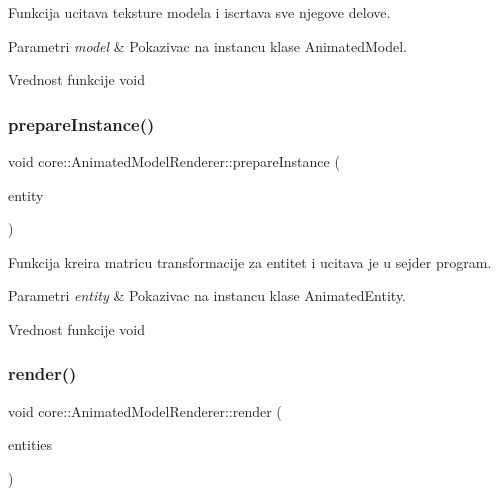 Funkcija ucitava teksture modela i iscrtava sve njegove delove. 


\begin{DoxyParams}{Parametri}
{\em model} & Pokazivac na instancu klase Animated\+Model. \\
\hline
\end{DoxyParams}
\begin{DoxyReturn}{Vrednost funkcije}
void 
\end{DoxyReturn}
\mbox{\label{classcore_1_1AnimatedModelRenderer_af16329ff35cbfd45aae572e85e7d5f0d}} 
\subsubsection{\texorpdfstring{prepare\+Instance()}{prepareInstance()}}
{\footnotesize\ttfamily void core\+::\+Animated\+Model\+Renderer\+::prepare\+Instance (\begin{DoxyParamCaption}\item[{\hyperlink{classentity_1_1AnimatedEntity}{Animated\+Entity} $\ast$}]{entity }\end{DoxyParamCaption})}



Funkcija kreira matricu transformacije za entitet i ucitava je u sejder program. 


\begin{DoxyParams}{Parametri}
{\em entity} & Pokazivac na instancu klase Animated\+Entity. \\
\hline
\end{DoxyParams}
\begin{DoxyReturn}{Vrednost funkcije}
void 
\end{DoxyReturn}
\mbox{\label{classcore_1_1AnimatedModelRenderer_ab6e05f6e3eada213e56938cd0b929ebe}} 
\subsubsection{\texorpdfstring{render()}{render()}}
{\footnotesize\ttfamily void core\+::\+Animated\+Model\+Renderer\+::render (\begin{DoxyParamCaption}\item[{map$<$ \hyperlink{classmodel_1_1AnimatedModel}{Animated\+Model} $\ast$, list$<$ \hyperlink{classentity_1_1AnimatedEntity}{Animated\+Entity} $\ast$$>$$>$}]{entities }\end{DoxyParamCaption})}



